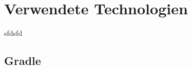 
\thispagestyle{plain}

\chapter{Verwendete Technologien}\label{c_verTech}
sfdsfd

\section{Gradle}\label{s_gradle}